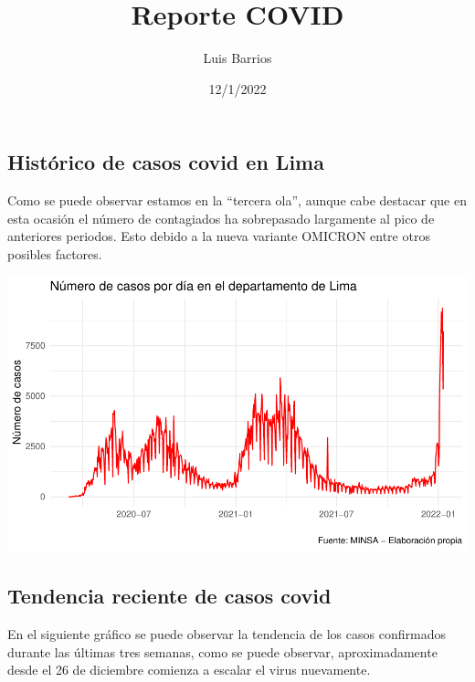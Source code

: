 \documentclass[
]{article}
\title{Reporte COVID}
\author{Luis Barrios}
\date{12/1/2022}
\begin{document}
\maketitle

\hypertarget{histuxf3rico-de-casos-covid-en-lima}{%
\subsection{Histórico de casos covid en
Lima}\label{histuxf3rico-de-casos-covid-en-lima}}

Como se puede observar estamos en la ``tercera ola'', aunque cabe
destacar que en esta ocasión el número de contagiados ha sobrepasado
largamente al pico de anteriores periodos. Esto debido a la nueva
variante OMICRON entre otros posibles factores.

\includegraphics[width=0.8\linewidth]{reporte_covid_files/figure-latex/covid graphs-1}

\hypertarget{tendencia-reciente-de-casos-covid}{%
\subsection{Tendencia reciente de casos
covid}\label{tendencia-reciente-de-casos-covid}}

En el siguiente gráfico se puede observar la tendencia de los casos
confirmados durante las últimas tres semanas, como se puede observar,
aproximadamente desde el 26 de diciembre comienza a escalar el virus
nuevamente.
\end{document}
